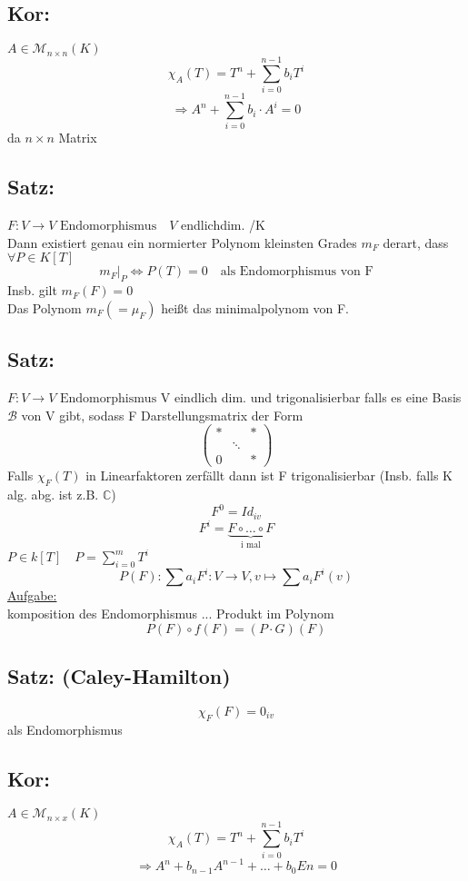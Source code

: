 \documentclass[titlepage,12pt,a4paper,ngerman]{report}
\newcommand{\tx}[1]{\textrm{#1}}
\newcommand{\enph}{F: V \to V \textrm{ Endomorphismus}}
\begin{document}
\subsection{Kor:}
$A \in \mathcal{M}_{n\times n}(K)$
$$\chi_A(T) = T^n + \sum^{n-1}_{i=0} b_i T^i$$
$$\Rightarrow A^n + \sum^{n-1}_{i=0} b_i \cdot A^i = 0$$
da $n\times n$ Matrix
\subsection{Satz:}
$\enph \quad V$ endlichdim. /K\\
Dann existiert genau ein normierter Polynom kleinsten Grades $m_F$ derart, dass $\forall P\in K[T]$\\
$$m_F | _P \Leftrightarrow P(T) = 0  \quad \textrm{als Endomorphismus von F}$$
Insb. gilt $m_F(F) = 0$\\
Das Polynom $m_F (= \mu _F)$ heißt das minimalpolynom von F.\\																										





\subsection{Satz:}
$\enph$ V eindlich dim. und trigonalisierbar
falls es eine Basis $\mathcal{B}$ von V gibt, sodass F Darstellungsmatrix der Form
$$\begin{pmatrix}
* && * \\
& \ddots \\
0 && *
\end{pmatrix}$$
Falls $\chi_F(T)$ in Linearfaktoren zerfällt dann ist F trigonalisierbar (Insb. falls K alg. abg. ist z.B. $ \mathbb{C}$)
$$F^0 = Id_{iv}$$
$$ F^i = \underbrace{F \circ \dots \circ F}_{\tx{i mal}}$$
$P\in k[T] \quad P = \sum_{i=0}^mT^i$
$$P(F): \sum a_i F^i: V\to V, v \mapsto \sum a_i F^i(v)$$
\underline{Aufgabe:}\\
komposition des Endomorphismus ... Produkt im Polynom
$$P(F) \circ f(F) = (P \cdot G)(F)$$

\subsection{Satz: (Caley-Hamilton)}
$$\chi_F(F) = 0_{iv} $$
als Endomorphismus
\subsection{Kor:} $A\in \mathcal{M}_{n\times x} (K)$
$$\chi_A(T) = T^n + \sum_{i=0}^{n-1} b_i T^i$$
$$\Rightarrow A^n + b_{n-1} A^{n-1} + \dots  + b_0 En = 0$$
\end{document}
